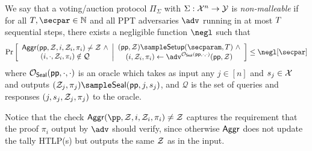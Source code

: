 \begin{definition}\label{def:non_malleability}
We say that a voting/auction protocol $\Pi_\Sigma$ with $\Sigma: \mathcal{X}^n \to \mathcal{Y}$ is \emph{non-malleable} if for all $\timeT,\secpar \in \mathbb{N}$ and all PPT adversaries $\adv$ running in at most $T$ sequential steps, there exists a negligible function $\negl$ such that %
\begin{align*}
    \Pr\left[
        \begin{array}{c}
        \Aggr(\pparam, \Z, i, \Z_i, \pi_i) \neq \Z~\land\\
        (i, \cdot, \Z_i, \pi_i) \notin \mathcal{Q}
        \end{array}
        \middle|
        \begin{array}{c}
            (\pparam, \Z) \sample \Setup(\secparam, \timeT)~\land\\
            (i, \Z_i, \pi_i) \gets \adv^{\oracle_\Seal(\pparam,\cdot,\cdot)}(\pparam, \Z)
        \end{array}
    \right]
    \leq \negl[\secpar]
\end{align*}
where $\mathcal{O}_{\mathsf{Seal}}(\mathsf{pp}, \cdot,\cdot)$ is an oracle which takes as input any $j \in [n]$ and $s_j \in \mathcal{X}$ and outputs $(\Z_j, \pi_j) \sample \Seal(\pparam, j, s_j)$, and $\mathcal{Q}$ is the set of queries and responses $(j, s_j, \mathcal{Z}_j, \pi_j)$ to the oracle.
\end{definition}

Notice that the check $\Aggr(\pp, \Z, i, \Z_i, \pi_i) \neq \Z$ captures the requirement that the proof $\pi_i$ output by $\adv$ should verify, since otherwise $\mathsf{Aggr}$ does not update the tally HTLP(s) but outputs the same $\mathcal{Z}$ as in the input.